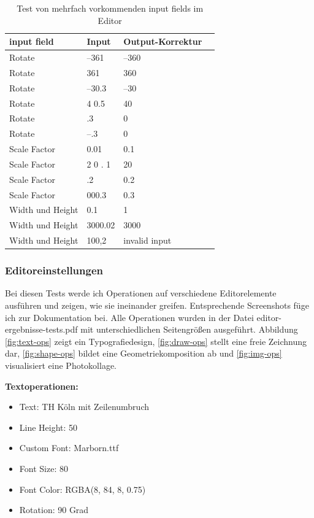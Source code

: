 \begin{table}[!htbp]
	\centering
	\begin{tabular}{|p{4cm}|p{3cm}|p{3cm}|p{3cm}|}
		\hline
		\textbf{input field}	& \textbf{Input} 	& \textbf{Output-Korrektur}		\\ 
		\hline
		Rotate					& –361 						& –360  				\\
		Rotate					& 361 						& 360 					\\ 
		Rotate					& –30.3 					& –30  					\\
		Rotate					& 4 0.5 					& 40 					\\
		Rotate					& .3 						& 0 					\\ 
		Rotate					& –.3 						& 0 					\\ 
		Scale Factor			& 0.01						& 0.1 					\\
		Scale Factor			& 2 0 . 1					& 20 					\\
		Scale Factor			& .2						& 0.2 					\\
		Scale Factor			& 000.3						& 0.3 					\\
		Width und Height		& 0.1						& 1 					\\
		Width und Height		& 3000.02					& 3000 					\\
		Width und Height		& 100,2						& invalid input 		\\
		\hline
	\end{tabular}
	\caption{Test von mehrfach vorkommenden input fields im Editor}
	\label{table:editor-input}
\end{table}

\subsubsection{Editoreinstellungen}
Bei diesen Tests werde ich Operationen auf verschiedene Editorelemente ausführen und zeigen, wie sie ineinander greifen. Entsprechende Screenshots füge ich zur Dokumentation bei. Alle Operationen wurden in der Datei editor-ergebnisse-tests.pdf mit unterschiedlichen Seitengrößen ausgeführt. Abbildung \ref{fig:text-ops} zeigt ein Typografiedesign, \ref{fig:draw-ops} stellt eine freie Zeichnung dar, \ref{fig:shape-ops} bildet eine Geometriekomposition ab und \ref{fig:img-ops} visualisiert eine Photokollage.

\textbf{Textoperationen:}
\begin{itemize}
	\item Text: TH Köln mit Zeilenumbruch
	\item Line Height: 50
	\item Custom Font: Marborn.ttf
	\item Font Size: 80
	\item Font Color: RGBA(8, 84, 8, 0.75)
	\item Rotation: 90 Grad
\end{itemize}

